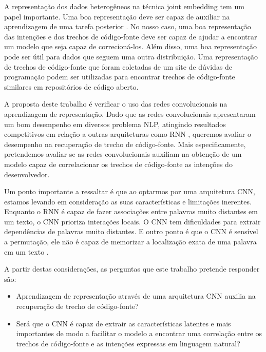 A representação dos dados heterogêneos na técnica joint embedding tem um papel importante. Uma boa representação deve ser capaz de auxiliar na aprendizagem de uma tarefa
posterior \citep{Goodfellow-et-al-2016:representation-learning}. No nosso caso, uma boa representação das intenções e dos trechos de código-fonte deve ser capaz de ajudar a encontrar um modelo que seja capaz de correcioná-los. Além disso, uma boa representação pode ser útil para dados que seguem uma outra distribuição. Uma representação de trechos de código-fonte que foram coletadas de um site de dúvidas de programação podem ser utilizadas para encontrar trechos de código-fonte similares em repositórios de código aberto.

A proposta deste trabalho é verificar o uso das redes convolucionais na aprendizagem de representação. Dado que as redes convolucionais apresentaram um bom desempenho em diversos problema NLP, atingindo resultados competitivos em relação a outras arquiteturas como RNN \citep{tom-young:trends-deep-learning-nlp}, queremos avaliar o desempenho na recuperação de trecho de código-fonte. Mais especificamente, pretendemos avaliar se as redes convolucionais auxiliam na obtenção de um modelo capaz de correlacionar os trechos de código-fonte as intenções do desenvolvedor. 

Um ponto importante a ressaltar é que ao optarmos por uma arquitetura CNN, estamos levando em consideração as suas características e limitações inerentes. Enquanto o RNN é capaz de fazer associações entre palavras muito distantes em um texto, o CNN prioriza interações locais. O CNN tem dificuldades para extrair dependências de palavras muito distantes. E outro ponto é que o CNN é sensível a permutação, ele não é capaz de memorizar a localização exata de uma palavra em um texto \citep{Goodfellow-et-al-2016:convolutional-networks, tom-young:trends-deep-learning-nlp}.

A partir destas considerações, as perguntas que este trabalho pretende responder são:

\begin{itemize}
    \item Aprendizagem de representação através de uma arquitetura CNN auxilia na recuperação de trecho de código-fonte?
    
    \item Será que o CNN é capaz de extrair as características latentes e mais importantes de modo a facilitar o modelo a encontrar uma correlação entre os trechos de código-fonte e as intenções expressas em linguagem natural?
\end{itemize}

